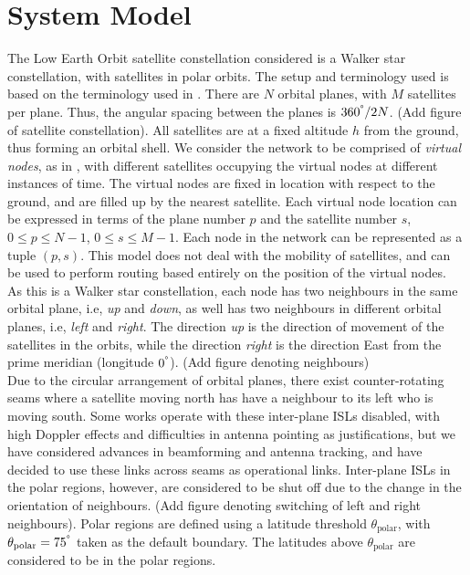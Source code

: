 \documentclass[10pt,conference, draftcls, letterpaper]{IEEEtran}
\newcommand{\rough}[1]{{\color{red} #1}}
\begin{document}
\section{System Model}
The Low Earth Orbit satellite constellation considered is a Walker star constellation, with satellites in polar orbits. The setup and terminology used is based on the terminology used in \cite{ekici-datagram}. There are $N$ orbital planes, with $M$ satellites per plane. Thus, the angular spacing between the planes is ${360^\degree}/{2N}$. \rough{(Add figure of satellite constellation)}. All satellites are at a fixed altitude $h$ from the ground, thus forming an orbital shell. We consider the network to be comprised of \textit{virtual nodes}, as in \cite{ekici-datagram}, with different satellites occupying the virtual nodes at different instances of time. The virtual nodes are fixed in location with respect to the ground, and are filled up by the nearest satellite. Each virtual node location can be expressed in terms of the plane number $p$ and the satellite number $s$, $0\leq p \leq N-1$, $0\leq s \leq M-1$. Each node in the network can be represented as a tuple $(p,s)$. This model does not deal with the mobility of satellites, and can be used to perform routing based entirely on the position of the virtual nodes. \\
As this is a Walker star constellation, each node has two neighbours in the same orbital plane, i.e, \textit{up} and \textit{down}, as well has two neighbours in different orbital planes, i.e, \textit{left} and \textit{right}. The direction \textit{up} is the direction of movement of the satellites in the orbits, while the direction \textit{right} is the direction East from the prime meridian (longitude $0^\degree$). \rough{(Add figure denoting neighbours)}\\
Due to the circular arrangement of orbital planes, there exist counter-rotating seams where a satellite moving north has have a neighbour to its left who is moving south. Some works operate with these inter-plane ISLs disabled, with high Doppler effects and difficulties in antenna pointing as justifications, but we have considered advances in beamforming and antenna tracking, and have decided to use these links across seams as operational links. Inter-plane ISLs in the polar regions, however, are considered to be shut off due to the change in the orientation of neighbours. \rough{(Add figure denoting switching of left and right neighbours)}. Polar regions are defined using a latitude threshold $\theta_{\text{polar}}$, with $\theta_{\text{polar}} = 75^\degree$ taken as the default boundary. The latitudes above $\theta_{\text{polar}}$ are considered to be in the polar regions.\\
\end{document}
